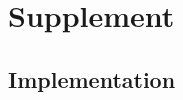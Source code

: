 \documentclass{bioinfo}
\theoremstyle{definition}
\newcommand{\beginsupplement}{%
	\setcounter{table}{0}
	\renewcommand{\thetable}{S\arabic{table}}%
	\setcounter{figure}{0}
	\renewcommand{\thefigure}{S\arabic{figure}}%
}
\begin{document}
%	
		
	
	
	
	
	\clearpage
	\setcounter{page}{1}
	
	\beginsupplement
	
	\section{Supplement}
	
	\subsection{Implementation}
	\label{implementation}
	
\end{document}

